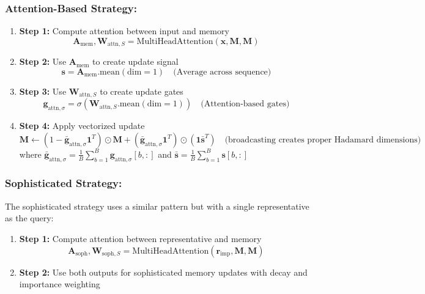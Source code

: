 \documentclass{article}
\begin{document}
\subsubsection{Attention-Based Strategy:}
\begin{enumerate}
\item \textbf{Step 1:} Compute attention between input and memory
   \begin{equation}
   \mathbf{A}_{\text{mem}}, \mathbf{W}_{\text{attn},S} = \text{MultiHeadAttention}(\mathbf{x}, \mathbf{M}, \mathbf{M})
   \end{equation}

\item \textbf{Step 2:} Use $\mathbf{A}_{\text{mem}}$ to create update signal
   \begin{equation}
   \mathbf{s} = \mathbf{A}_{\text{mem}}.\text{mean}(\text{dim}=1) \quad \text{(Average across sequence)}
   \end{equation}

\item \textbf{Step 3:} Use $\mathbf{W}_{\text{attn},S}$ to create update gates
   \begin{equation}
   \mathbf{g}_{\text{attn},\sigma} = \sigma(\mathbf{W}_{\text{attn},S}.\text{mean}(\text{dim}=1)) \quad \text{(Attention-based gates)}
   \end{equation}

\item \textbf{Step 4:} Apply vectorized update
   \begin{equation}
   \mathbf{M} \leftarrow (1 - \bar{\mathbf{g}}_{\text{attn},\sigma} \mathbf{1}^T) \odot \mathbf{M} + (\bar{\mathbf{g}}_{\text{attn},\sigma} \mathbf{1}^T) \odot (\mathbf{1} \bar{\mathbf{s}}^T) \quad \text{(broadcasting creates proper Hadamard dimensions)}
   \end{equation}
   where $\bar{\mathbf{g}}_{\text{attn},\sigma} = \frac{1}{B}\sum_{b=1}^{B} \mathbf{g}_{\text{attn},\sigma}[b, :]$ and $\bar{\mathbf{s}} = \frac{1}{B}\sum_{b=1}^{B} \mathbf{s}[b, :]$
\end{enumerate}

\subsubsection{Sophisticated Strategy:}
The sophisticated strategy uses a similar pattern but with a single representative as the query:

\begin{enumerate}
\item \textbf{Step 1:} Compute attention between representative and memory
   \begin{equation}
   \mathbf{A}_{\text{soph}}, \mathbf{W}_{\text{soph},S} = \text{MultiHeadAttention}(\mathbf{r}_{\text{imp}}, \mathbf{M}, \mathbf{M})
   \end{equation}

\item \textbf{Step 2:} Use both outputs for sophisticated memory updates with decay and importance weighting
\end{enumerate}
\end{document}
